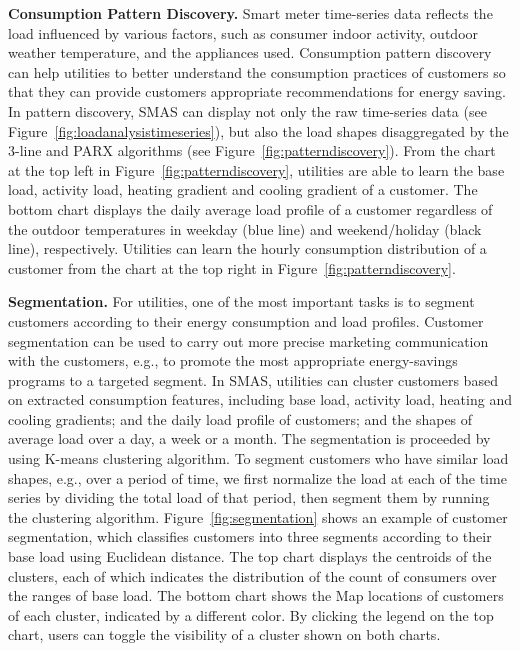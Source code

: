 \documentclass{sig-alternate}
\newcommand{\eg}{e.g.}
\begin{document}
{\bf Consumption Pattern Discovery.}
Smart meter time-series data reflects the load influenced by various factors, such as consumer indoor activity, outdoor weather temperature, and the appliances used. Consumption pattern discovery can help utilities to better understand the consumption practices of customers so that they can provide customers appropriate recommendations for energy saving. In pattern discovery, SMAS can display  not only the raw time-series data (see Figure~\ref{fig:loadanalysistimeseries}), but also the load shapes disaggregated by the 3-line and PARX algorithms (see  Figure~\ref{fig:patterndiscovery}). From the chart at the top left in Figure~\ref{fig:patterndiscovery}, utilities are able to learn the base load, activity load, heating gradient and cooling gradient of a customer. The bottom chart displays the daily average load profile of a customer regardless of the outdoor temperatures in weekday (blue line) and weekend/holiday (black line), respectively. Utilities can learn the hourly consumption distribution of a customer from the chart at the top right in Figure~\ref{fig:patterndiscovery}.


{\bf Segmentation.}
For utilities, one of the most important tasks is to segment  customers according to their  energy consumption and load profiles. Customer segmentation can be used to carry out  more precise marketing communication with the customers, \eg, to promote the most appropriate energy-savings programs to a targeted segment. In SMAS, utilities can cluster customers based on extracted consumption features, including base load, activity load, heating and cooling gradients; and the daily load profile of customers; and the shapes of average load over a day, a week or a month. The segmentation is proceeded by using K-means clustering algorithm. To segment customers who have similar load shapes, \eg, over a period of time, we first normalize the load at each of the time series by dividing the total load of that period, then segment them by running the clustering algorithm. Figure~\ref{fig:segmentation} shows an example of customer segmentation, which classifies customers into three segments according to their base load using Euclidean distance. The top chart displays the centroids of the clusters, each of which indicates the distribution of the count of consumers over the ranges of base load. The bottom chart shows the Map locations of customers of each cluster, indicated by a different color. By clicking the legend on the top chart, users can toggle the visibility of a cluster shown on both charts.
\end{document}
